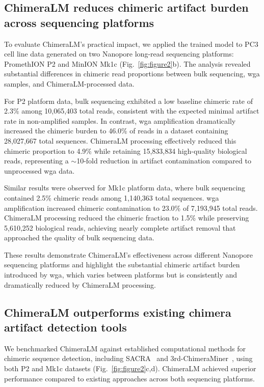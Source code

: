 \documentclass[pdflatex,sn-nature]{sn-jnl}%
\theoremstyle{thmstyleone}%
\theoremstyle{thmstyletwo}%
\theoremstyle{thmstylethree}%
\begin{document}
\subsection*{ChimeraLM reduces chimeric artifact burden across sequencing platforms}

To evaluate ChimeraLM's practical impact, we applied the trained model to PC3 cell line data generated on two Nanopore long-read sequencing platforms: PromethION P2 and MinION Mk1c (Fig.~\ref{fig:figure2}b).
The analysis revealed substantial differences in chimeric read proportions between bulk sequencing, \gls{wga} samples, and ChimeraLM-processed data.

For P2 platform data, bulk sequencing exhibited a low baseline chimeric rate of 2.3\% among 10,065,403 total reads, consistent with the expected minimal artifact rate in non-amplified samples.
In contrast, \gls{wga} amplification dramatically increased the chimeric burden to 46.0\% of reads in a dataset containing 28,027,667 total sequences.
ChimeraLM processing effectively reduced this chimeric proportion to 4.9\% while retaining 15,833,834 high-quality biological reads, representing a $\sim$10-fold reduction in artifact contamination compared to unprocessed \gls{wga} data.

Similar results were observed for Mk1c platform data, where bulk sequencing contained 2.5\% chimeric reads among 1,140,363 total sequences.
\gls{wga} amplification increased chimeric contamination to 23.0\% of 7,193,945 total reads.
ChimeraLM processing reduced the chimeric fraction to 1.5\% while preserving 5,610,252 biological reads, achieving nearly complete artifact removal that approached the quality of bulk sequencing data.

These results demonstrate ChimeraLM's effectiveness across different Nanopore sequencing platforms and highlight the substantial chimeric artifact burden introduced by \gls{wga}, which varies between platforms but is consistently and dramatically reduced by ChimeraLM processing.

\subsection*{ChimeraLM outperforms existing chimera artifact detection tools}

We benchmarked ChimeraLM against established computational methods for chimeric sequence detection, including SACRA~\cite{kiguchi2021long} and 3rd-ChimeraMiner~\cite{lu2023exploration}, using both P2 and Mk1c datasets (Fig.~\ref{fig:figure2}c,d).
ChimeraLM achieved superior performance compared to existing approaches across both sequencing platforms.
\end{document}
